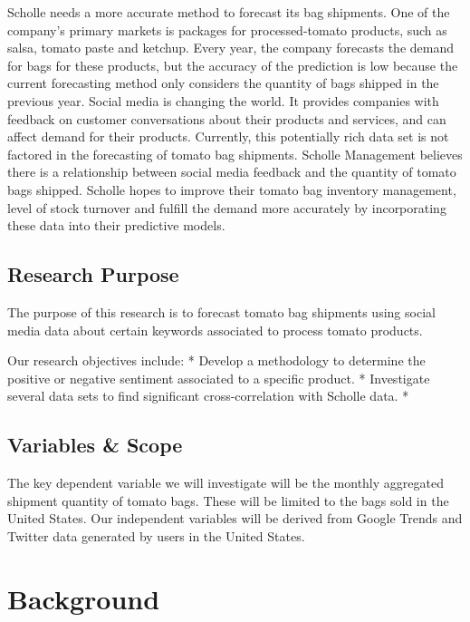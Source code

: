 \documentclass[12pt,oneside]{chicagocapstone}
\begin{document}
Scholle needs a more accurate method to forecast its bag shipments. One
of the company's primary markets is packages for processed-tomato
products, such as salsa, tomato paste and ketchup. Every year, the
company forecasts the demand for bags for these products, but the
accuracy of the prediction is low because the current forecasting method
only considers the quantity of bags shipped in the previous year. Social
media is changing the world. It provides companies with feedback on
customer conversations about their products and services, and can affect
demand for their products. Currently, this potentially rich data set is
not factored in the forecasting of tomato bag shipments. Scholle
Management believes there is a relationship between social media
feedback and the quantity of tomato bags shipped. Scholle hopes to
improve their tomato bag inventory management, level of stock turnover
and fulfill the demand more accurately by incorporating these data into
their predictive models.

\section*{Research Purpose}\label{research_purpose}

The purpose of this research is to forecast tomato bag shipments using
social media data about certain keywords associated to process tomato
products.

Our research objectives include: * Develop a methodology to determine
the positive or negative sentiment associated to a specific product. *
Investigate several data sets to find significant cross-correlation with
Scholle data. *

\section*{Variables \& Scope}\label{variables_scope}

The key dependent variable we will investigate will be the monthly
aggregated shipment quantity of tomato bags. These will be limited to
the bags sold in the United States. Our independent variables will be
derived from Google Trends and Twitter data generated by users in the
United States.

\chapter*{Background}\label{background}
\end{document}
